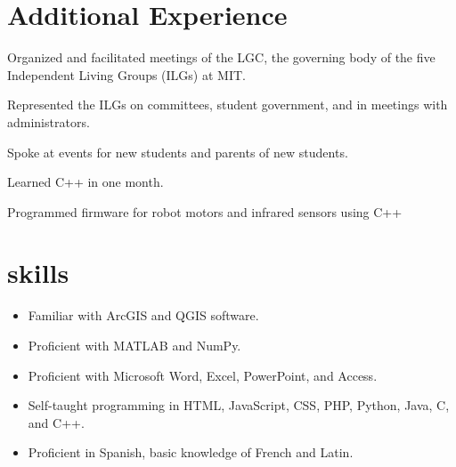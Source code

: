 \documentclass[11pt]{article}
\begin{document}
\section{Additional Experience}
\def\employer{Living Group Council (LGC)}
\def\location{Cambridge, MA}
\def\title{Speaker; Undergraduate Association Representative}
\def\dates{May 2015--present}
\begin{position}
\item Organized and facilitated meetings of the LGC, the governing body of the five Independent Living Groups (ILGs) at MIT.
\item Represented the ILGs on committees, student government, and in meetings with administrators.
\item Spoke at events for new students and parents of new students.
\end{position}

\def\employer{Mobile Autonomous Systems Laboratory}
\def\location{Cambridge, MA}
\def\title{Participant/Programmer}
\def\dates{January 2015}
\begin{position}
\item Learned C++ in one month.
\item Programmed firmware for robot motors and infrared sensors using C++
\end{position}

\section{skills}
\begin{itemize}
\item Familiar with ArcGIS and QGIS software.
\item Proficient with MATLAB and NumPy.
\item Proficient with Microsoft Word, Excel, PowerPoint, and Access.
\item Self-taught programming in HTML, JavaScript, CSS, PHP, Python, Java, C, and C++.
\item Proficient in Spanish, basic knowledge of French and Latin.
\end{itemize}
\end{document}
